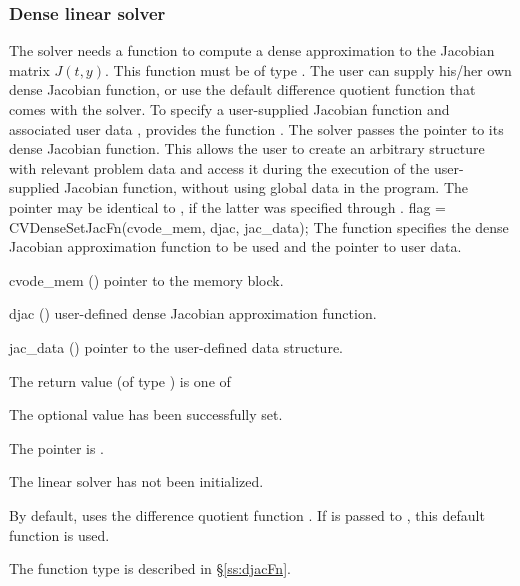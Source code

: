 \subsubsection{Dense linear solver}\label{sss:optin_dense}
The 
{\cvdense} solver needs a function to compute a dense approximation to
the Jacobian matrix $J(t,y)$.  This function must be of type . 
The user can supply his/her own dense Jacobian function, or use the default 
difference quotient function  
that comes with the {\cvdense} solver.
To specify a user-supplied Jacobian function  and associated user 
data , {\cvdense} provides the function .
The {\cvdense} solver passes the pointer  
to its dense Jacobian function. This allows the user to
create an arbitrary structure with relevant problem data and access it
during the execution of the user-supplied Jacobian function, without
using global data in the program.  The pointer  may be
identical to , if the latter was specified through .
{
  flag = CVDenseSetJacFn(cvode\_mem, djac, jac\_data);
}
{
  The function  specifies the dense Jacobian
  approximation function to be used and the pointer to user data.
}
{
  \begin{args}
  \item[cvode\_mem] ()
    pointer to the {\cvode} memory block.
  \item[djac] ()
    user-defined dense Jacobian approximation function.
  \item[jac\_data] ()
    pointer to the user-defined data structure.
  \end{args}
}
{
  The return value  (of type ) is one of
  \begin{args}
  \item[\Id{CVDENSE\_SUCCESS}] 
    The optional value has been successfully set.
  \item[\Id{CVDENSE\_MEM\_NULL}]
    The  pointer is .
  \item[\Id{CVDENSE\_LMEM\_NULL}]
    The {\cvdense} linear solver has not been initialized.
  \end{args}
}
{
  By default, {\cvdense} uses the difference quotient function .
  If  is passed to , this default function is used.

  The function type  is described in \S\ref{ss:djacFn}.
}

